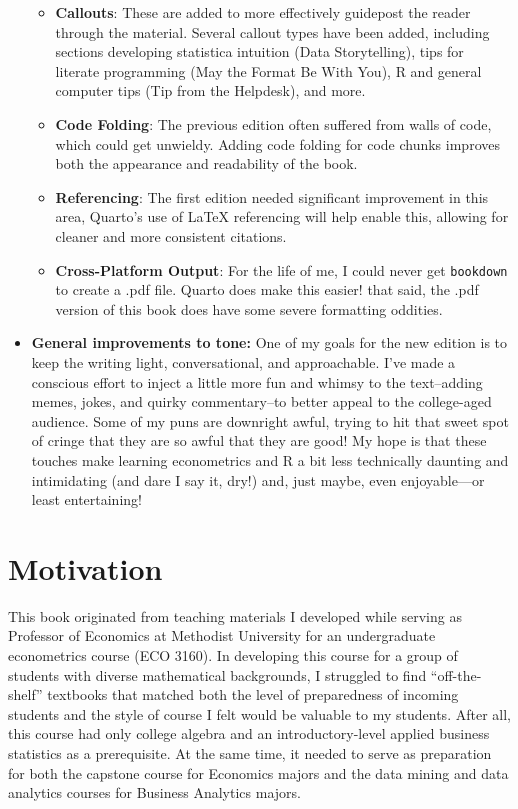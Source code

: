 \documentclass[
  letterpaper,
]{book}
\providecommand{\tightlist}{%
  \setlength{\itemsep}{0pt}\setlength{\parskip}{0pt}}\usepackage{longtable,booktabs,array}
\begin{document}
\begin{itemize}
  \begin{itemize}
  \tightlist
  \item
    \textbf{Callouts}: These are added to more effectively guidepost the
    reader through the material. Several callout types have been added,
    including sections developing statistica intuition (Data
    Storytelling), tips for literate programming (May the Format Be With
    You), R and general computer tips (Tip from the Helpdesk), and more.
  \item
    \textbf{Code Folding}: The previous edition often suffered from
    walls of code, which could get unwieldy. Adding code folding for
    code chunks improves both the appearance and readability of the
    book.
  \item
    \textbf{Referencing}: The first edition needed significant
    improvement in this area, Quarto's use of LaTeX referencing will
    help enable this, allowing for cleaner and more consistent
    citations.
  \item
    \textbf{Cross-Platform Output}: For the life of me, I could never
    get \texttt{bookdown} to create a .pdf file. Quarto does make this
    easier! that said, the .pdf version of this book does have some
    severe formatting oddities.
  \end{itemize}
\item
  \textbf{General improvements to tone:} One of my goals for the new
  edition is to keep the writing light, conversational, and
  approachable. I've made a conscious effort to inject a little more fun
  and whimsy to the text--adding memes, jokes, and quirky commentary--to
  better appeal to the college-aged audience. Some of my puns are
  downright awful, trying to hit that sweet spot of cringe that they are
  so awful that they are good! My hope is that these touches make
  learning econometrics and R a bit less technically daunting and
  intimidating (and dare I say it, dry!) and, just maybe, even
  enjoyable---or least entertaining!
\end{itemize}

\section*{Motivation}\label{motivation}


This book originated from teaching materials I developed while serving
as Professor of Economics at Methodist University for an undergraduate
econometrics course (ECO 3160). In developing this course for a group of
students with diverse mathematical backgrounds, I struggled to find
``off-the-shelf'' textbooks that matched both the level of preparedness
of incoming students and the style of course I felt would be valuable to
my students. After all, this course had only college algebra and an
introductory-level applied business statistics as a prerequisite. At the
same time, it needed to serve as preparation for both the capstone
course for Economics majors and the data mining and data analytics
courses for Business Analytics majors.
\end{document}
